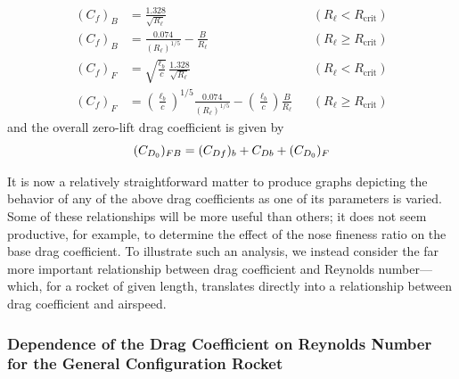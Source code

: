\label{ch3:eq:203}%
\label{ch3:eq:204}%
\begin{align*}
(C_f)_B &= \frac{1.328}{\sqrt{R_\ell}} && (R_\ell < R_{\mathrm{crit}})
  \tag{203a}\label{ch3:eq:203a}\\
(C_f)_B &= \frac{0.074}{(R_\ell)^{1/5}} - \frac{B}{R_\ell} && (R_\ell \ge R_{\mathrm{crit}})
  \tag{203b}\label{ch3:eq:203b}\\
(C_f)_F &= \sqrt{\frac{\ell_b}{c}}\,\frac{1.328}{\sqrt{R_\ell}} && (R_\ell < R_{\mathrm{crit}})
  \tag{204a}\label{ch3:eq:204a}\\
(C_f)_F &= \left(\frac{\ell_b}{c}\right)^{1/5}\frac{0.074}{(R_\ell)^{1/5}}
  - \left(\frac{\ell_b}{c}\right)\frac{B}{R_\ell} && (R_\ell \ge R_{\mathrm{crit}})
  \tag{204b}\label{ch3:eq:204b}
\end{align*}
and the overall zero-lift drag coefficient is given by
\begin{equation}\label{ch3:eq:205}
(C_{D_0})_{FB} = (C_{Df})_b + C_{Db} + (C_{D_0})_F
\end{equation}

It is now a relatively straightforward matter to produce graphs depicting the behavior of any of
the above drag coefficients as one of its parameters is varied. Some of these relationships will
be more useful than others; it does not seem productive, for example, to determine the effect of
the nose fineness ratio on the base drag coefficient. To illustrate such an analysis, we instead
consider the far more important relationship between drag coefficient and Reynolds number---which,
for a rocket of given length, translates directly into a relationship between drag coefficient and
airspeed.

\subsubsection{Dependence of the Drag Coefficient on Reynolds Number for the General Configuration
Rocket}\label{ch3:sec:6.3.2}

